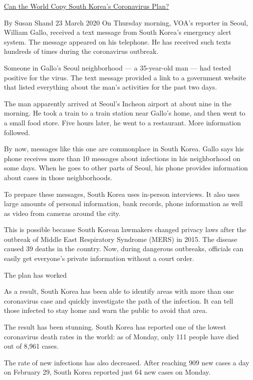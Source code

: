 \href{https://www.51voa.com/VOA_Special_English/can-the-world-copy-south-korea-s-coronavirus-plan-84162.html}{Can the World Copy South Korea’s Coronavirus Plan?} \newline

By Susan Shand
23 March 2020
On Thursday morning, VOA's reporter in Seoul, William Gallo, received a text message from South Korea's emergency alert system. The message appeared on his telephone. He has received such texts hundreds of times during the coronavirus outbreak.

Someone in Gallo's Seoul neighborhood — a 35-year-old man — had tested positive for the virus. The text message provided a link to a government website that listed everything about the man's activities for the past two days.

The man apparently arrived at Seoul's Incheon airport at about nine in the morning. He took a train to a train station near Gallo's home, and then went to a small food store. Five hours later, he went to a restaurant. More information followed.

By now, messages like this one are commonplace in South Korea. Gallo says his phone receives more than 10 messages about infections in his neighborhood on some days. When he goes to other parts of Seoul, his phone provides information about cases in those neighborhoods.

To prepare these messages, South Korea uses in-person interviews. It also uses large amounts of personal information, bank records, phone information as well as video from cameras around the city.

This is possible because South Korean lawmakers changed privacy laws after the outbreak of Middle East Respiratory Syndrome (MERS) in 2015. The disease caused 39 deaths in the country. Now, during dangerous outbreaks, officials can easily get everyone's private information without a court order.

The plan has worked

As a result, South Korea has been able to identify areas with more than one coronavirus case and quickly investigate the path of the infection. It can tell those infected to stay home and warn the public to avoid that area.

The result has been stunning. South Korea has reported one of the lowest coronavirus death rates in the world: as of Monday, only 111 people have died out of 8,961 cases.

The rate of new infections has also decreased. After reaching 909 new cases a day on February 29, South Korea reported just 64 new cases on Monday.


